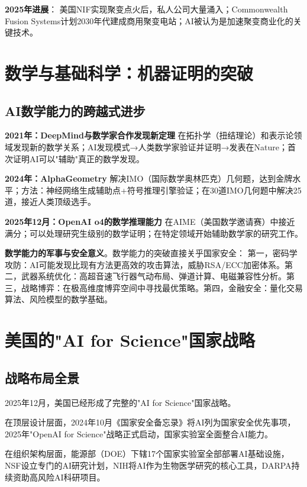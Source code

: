\textbf{2025年进展}：
美国NIF实现聚变点火后，私人公司大量涌入；Commonwealth Fusion Systems计划2030年代建成商用聚变电站；AI被认为是加速聚变商业化的关键技术。

\section{数学与基础科学：机器证明的突破}

\subsection{AI数学能力的跨越式进步}

\textbf{2021年：DeepMind与数学家合作发现新定理}\cite{davies2021advancing}
在拓扑学（扭结理论）和表示论领域发现新的数学关系；AI发现模式→人类数学家验证并证明→发表在Nature；首次证明AI可以"辅助"真正的数学发现。

\textbf{2024年：AlphaGeometry}\cite{romera2024mathematical}
解决IMO（国际数学奥林匹克）几何题，达到金牌水平；方法：神经网络生成辅助点+符号推理引擎验证；在30道IMO几何题中解决25道，接近人类顶级选手。

\textbf{2025年12月：OpenAI o4的数学推理能力}
在AIME（美国数学邀请赛）中接近满分；可以处理研究生级别的数学证明；在特定领域开始辅助数学家的研究工作。

\textbf{数学能力的军事与安全意义}。数学能力的突破直接关乎国家安全：
第一，密码学攻防：AI可能发现比现有方法更高效的攻击算法，威胁RSA/ECC加密体系。第二，武器系统优化：高超音速飞行器气动布局、弹道计算、电磁兼容性分析。第三，战略博弈：在极高维度博弈空间中寻找最优策略。第四，金融安全：量化交易算法、风险模型的数学基础。

\section{美国的"AI for Science"国家战略}

\subsection{战略布局全景}

2025年12月，美国已经形成了完整的"AI for Science"国家战略。

在顶层设计层面，2024年10月《国家安全备忘录》将AI列为国家安全优先事项，2025年"OpenAI for Science"战略正式启动，国家实验室全面整合AI能力。

在组织架构层面，能源部（DOE）下辖17个国家实验室全部部署AI基础设施，NSF设立专门的AI研究计划，NIH将AI作为生物医学研究的核心工具，DARPA持续资助高风险AI科研项目。

